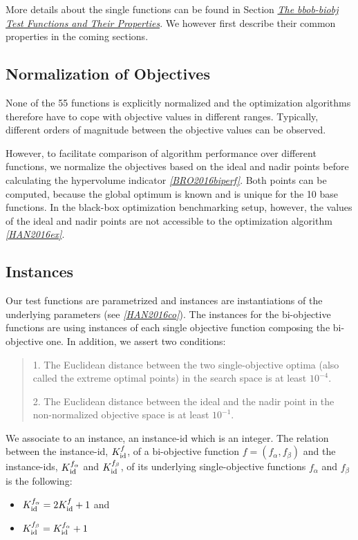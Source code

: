 \documentclass[letterpaper,12pt,english]{article}
\begin{document}
More details about the single functions can be found in Section {\hyperref[index:sec\string-test\string-functions]{\emph{The bbob-biobj Test Functions and Their Properties}}}. We however first describe their common properties in the coming sections.


\subsection{Normalization of Objectives}
\label{index:normalization-of-objectives}
None of the 55  functions is explicitly normalized and the
optimization algorithms therefore have to cope with objective values in
different ranges. Typically, different orders of magnitude
between the objective values can be observed.

However, to facilitate comparison of algorithm performance over different functions,
we normalize the objectives based on the ideal and nadir points
before calculating the hypervolume indicator \label{index:id7}{\hyperref[index:bro2016biperf]{\emph{{[}BRO2016biperf{]}}}}.
Both points can be computed, because the global
optimum is known and is unique for the 10  base functions.
In the black-box optimization benchmarking setup, however, the values of the
ideal and nadir points are not accessible to the optimization algorithm
\label{index:id8}{\hyperref[index:han2016ex]{\emph{{[}HAN2016ex{]}}}}.


\subsection{Instances}
\label{index:instances}
Our test functions are parametrized and instances are instantiations of the
underlying parameters (see \label{index:id9}{\hyperref[index:han2016co]{\emph{{[}HAN2016co{]}}}}). The instances for the bi-objective
functions are using instances of each single objective function composing the
bi-objective one. In addition, we assert two conditions:
\begin{quote}

1. The Euclidean distance between the two single-objective optima (also called the
extreme optimal points) in the search space is at least \(10^{-4}\).

2. The Euclidean distance between the ideal and the nadir point in the non-normalized
objective space is at least \(10^{-1}\).
\end{quote}

We associate to an instance, an instance-id which is an integer. The relation between the
instance-id, \(K^{f}_{\rm id}\), of a bi-objective function \(f = (f_\alpha, f_\beta)\)
and the instance-ids, \(K_{\rm id}^{f_\alpha}\) and \(K_{\rm id}^{f_\beta}\), of its
underlying single-objective functions \(f_\alpha\) and \(f_\beta\) is the following:
\begin{itemize}
\item {} 
\(K_{\rm id}^{f_\alpha} = 2 K^{f}_{\rm id} + 1\) and

\item {} 
\(K_{\rm id}^{f_\beta} = K_{\rm id}^{f_\alpha} + 1\)

\end{itemize}
\end{document}
